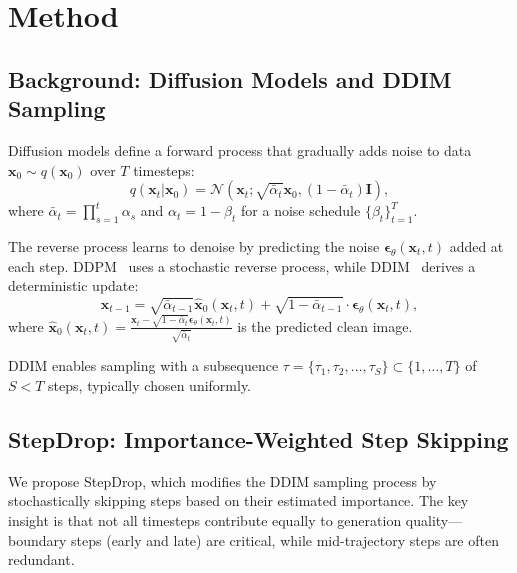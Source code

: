 \documentclass{article}
\begin{document}
\section{Method}
\label{sec:method}

\subsection{Background: Diffusion Models and DDIM Sampling}

Diffusion models define a forward process that gradually adds noise to data $\mathbf{x}_0 \sim q(\mathbf{x}_0)$ over $T$ timesteps:
\begin{equation}
    q(\mathbf{x}_t | \mathbf{x}_0) = \mathcal{N}(\mathbf{x}_t; \sqrt{\bar{\alpha}_t}\mathbf{x}_0, (1-\bar{\alpha}_t)\mathbf{I}),
\end{equation}
where $\bar{\alpha}_t = \prod_{s=1}^{t} \alpha_s$ and $\alpha_t = 1 - \beta_t$ for a noise schedule $\{\beta_t\}_{t=1}^T$.

The reverse process learns to denoise by predicting the noise $\boldsymbol{\epsilon}_\theta(\mathbf{x}_t, t)$ added at each step. DDPM~\citep{ho2020denoising} uses a stochastic reverse process, while DDIM~\citep{song2020denoising} derives a deterministic update:
\begin{equation}
    \mathbf{x}_{t-1} = \sqrt{\bar{\alpha}_{t-1}} \hat{\mathbf{x}}_0(\mathbf{x}_t, t) + \sqrt{1 - \bar{\alpha}_{t-1}} \cdot \boldsymbol{\epsilon}_\theta(\mathbf{x}_t, t),
    \label{eq:ddim}
\end{equation}
where $\hat{\mathbf{x}}_0(\mathbf{x}_t, t) = \frac{\mathbf{x}_t - \sqrt{1-\bar{\alpha}_t}\boldsymbol{\epsilon}_\theta(\mathbf{x}_t, t)}{\sqrt{\bar{\alpha}_t}}$ is the predicted clean image.

DDIM enables sampling with a subsequence $\tau = \{\tau_1, \tau_2, \ldots, \tau_S\} \subset \{1, \ldots, T\}$ of $S < T$ steps, typically chosen uniformly.

\subsection{StepDrop: Importance-Weighted Step Skipping}

We propose StepDrop, which modifies the DDIM sampling process by stochastically skipping steps based on their estimated importance. The key insight is that not all timesteps contribute equally to generation quality—boundary steps (early and late) are critical, while mid-trajectory steps are often redundant.
\end{document}
